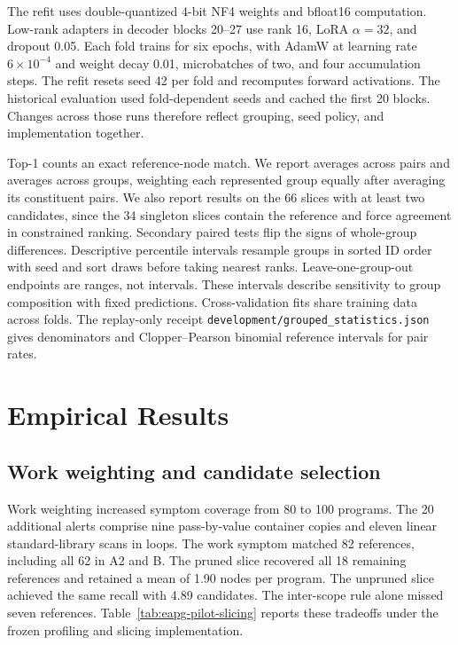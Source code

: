 The refit uses double-quantized 4-bit NF4 weights and bfloat16 computation. Low-rank adapters in decoder blocks 20--27 use rank 16, LoRA $\alpha=32$, and dropout 0.05. Each fold trains for six epochs, with AdamW at learning rate $6\times10^{-4}$ and weight decay 0.01, microbatches of two, and four accumulation steps. The refit resets seed 42 per fold and recomputes forward activations. The historical evaluation used fold-dependent seeds and cached the first 20 blocks. Changes across those runs therefore reflect grouping, seed policy, and implementation together.

Top-1 counts an exact reference-node match. We report averages across pairs and averages across groups, weighting each represented group equally after averaging its constituent pairs. We also report results on the 66 slices with at least two candidates, since the 34 singleton slices contain the reference and force agreement in constrained ranking. Secondary paired tests flip the signs of whole-group differences. Descriptive percentile intervals resample groups in sorted ID order with seed \GroupedBootstrapSeed{} and sort \GroupedBootstrapDraws{} draws before taking nearest ranks. Leave-one-group-out endpoints are ranges, not intervals. These intervals describe sensitivity to group composition with fixed predictions. Cross-validation fits share training data across folds. The replay-only receipt \nolinkurl{development/grouped_statistics.json} gives denominators and Clopper--Pearson binomial reference intervals for pair rates.

\section{Empirical Results}
\label{sec:empirical-results}

\subsection{Work weighting and candidate selection}

Work weighting increased symptom coverage from 80 to 100 programs. The 20 additional alerts comprise nine pass-by-value container copies and eleven linear standard-library scans in loops. The work symptom matched 82 references, including all 62 in A2 and B. The pruned slice recovered all 18 remaining references and retained a mean of 1.90 nodes per program. The unpruned slice achieved the same recall with 4.89 candidates. The inter-scope rule alone missed seven references. Table~\ref{tab:eapg-pilot-slicing} reports these tradeoffs under the frozen profiling and slicing implementation.

